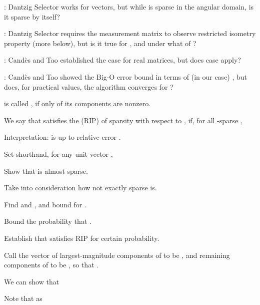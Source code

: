 {
\I {}: Dantzig Selector works for  vectors, but while  is sparse in the angular domain, is it sparse by itself?

\I {}: Dantzig Selector requires the measurement matrix to observe restricted isometry property (more below), but is it true for , and under what  of ?

\I {}: Cand\`es and Tao established the case for real matrices, but does  case apply?

\I {}: Cand\`es and Tao showed the Big-O error bound in terms of (in our case) , but does, for practical values, the algorithm converges for ?
}
{
\I {} is called , if only  of its components are nonzero.

\I We say that  satisfies the  (RIP) of sparsity  with respect to , if, for all -sparse ,

\I Interpretation:  is  up to relative error .

\I Set shorthand, for any unit vector ,
}
{
\I Show that  is almost sparse.

\I Take into consideration how not exactly sparse  is.

\I Find  and , and bound  for .

\I Bound the probability that .

\I Establish that  satisfies RIP for certain probability.
}
{
\I Call the vector of largest-magnitude  components of  to be , and remaining components of  to be , so that .

\I We can show that 

\I Note that  as 
}
